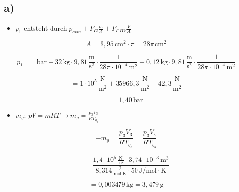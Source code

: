 

\subsection*{a)}

\begin{itemize}
    \item $p_1$ entsteht durch $p_{atm} + F_G \frac{m}{A} + F_{OBV} \frac{V}{A}$
\end{itemize}

\[
A = 8,95 \, \text{cm}^2 \cdot \pi = 28 \pi \, \text{cm}^2
\]

\[
p_1 = 1 \, \text{bar} + 32 \, \text{kg} \cdot 9,81 \, \frac{\text{m}}{\text{s}^2} \cdot \frac{1}{28 \pi \cdot 10^{-4} \, \text{m}^2} + 0,12 \, \text{kg} \cdot 9,81 \, \frac{\text{m}}{\text{s}^2} \cdot \frac{1}{28 \pi \cdot 10^{-4} \, \text{m}^2}
\]

\[
= 1 \cdot 10^5 \, \frac{\text{N}}{\text{m}^2} + 35966,3 \, \frac{\text{N}}{\text{m}^2} + 42,3 \, \frac{\text{N}}{\text{m}^2}
\]

\[
= 1,40 \, \text{bar}
\]

\begin{itemize}
    \item $m_g$: $pV = mRT \rightarrow m_g = \frac{p_3 V_3}{R T_{g_3}}$
\end{itemize}

\[
-m_g = \frac{p_3 V_3}{R T_{g_3}} = \frac{p_3 V_3}{R T_{g_3}}
\]

\[
= \frac{1,4 \cdot 10^5 \, \frac{\text{N}}{\text{m}^2} \cdot 3,74 \cdot 10^{-3} \, \text{m}^3}{8,314 \, \frac{\text{J}}{\text{mol} \cdot \text{K}} \cdot 50 \, \text{J} / \text{mol} \cdot \text{K}}
\]

\[
= 0,003479 \, \text{kg} = 3,479 \, \text{g}
\]